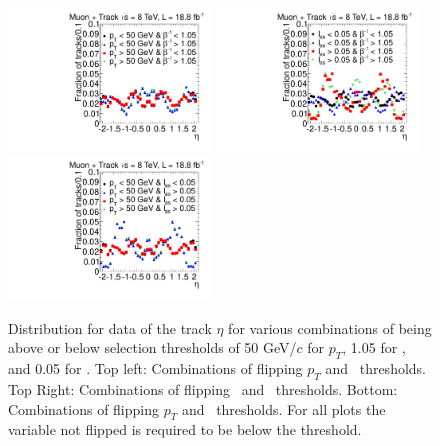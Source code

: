\begin{figure}
\begin{center}
\includegraphics[clip=false, trim=0.0cm 0cm 0.0cm 0cm, width=0.48\textwidth]{figures/tkmu/Selection_Data8TeV_EtaRegionsPtTOF_016}
\includegraphics[clip=false, trim=0.0cm 0cm 0.0cm 0cm, width=0.48\textwidth]{figures/tkmu/Selection_Data8TeV_EtaRegionsTOFdEdx_016} \\
\includegraphics[clip=false, trim=0.0cm 0cm 0.0cm 0cm, width=0.48\textwidth]{figures/tkmu/Selection_Data8TeV_EtaRegionsPtdEdx_016}
\end{center}
\caption[Distribution for data of the track $\eta$ for various combinations of being above or below selection thresholds in the \tktof\ analysis]
{Distribution for data of the track $\eta$ for various combinations of being above or below selection thresholds of
50 GeV/$c$ for $p_T$, 1.05 for \invbeta, and 0.05 for \ias.
Top left: Combinations of flipping $p_T$ and \invbeta\ thresholds. Top Right: Combinations of flipping \invbeta\ and \ias\ thresholds.
Bottom: Combinations of flipping $p_T$ and \ias\ thresholds. For all plots the variable not flipped is required to be below the threshold.}
\label{fig:etacorrelation}
\end{figure}

